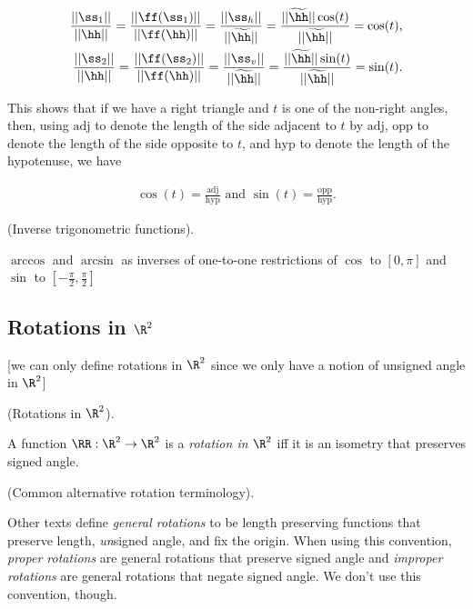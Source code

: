 \begin{deriv}
	\begin{align*}
		\frac{||\ss_1||}{||\hh||} = \frac{||\ff(\ss_1)||}{||\ff(\hh)||} = \frac{||\ss_h||}{||\thh||} = \frac{||\thh||\cos(t)}{||\thh||} = \cos(t), \\
		\frac{||\ss_2||}{||\hh||} = \frac{||\ff(\ss_2)||}{||\ff(\hh)||} = \frac{||\ss_v||}{||\thh||} = \frac{||\thh||\sin(t)}{||\thh||} = \sin(t).
	\end{align*}
	
	This shows that if we have a right triangle and $t$ is one of the non-right angles, then, using $\text{adj}$ to denote the length of the side adjacent to $t$ by $\text{adj}$, $\text{opp}$ to denote the length of the side opposite to $t$, and $\text{hyp}$ to denote the length of the hypotenuse, we have
	
	\begin{align*}
		\cos(t) = \frac{\text{adj}}{\text{hyp}} \text{ and } \sin(t) = \frac{\text{opp}}{\text{hyp}}.
	\end{align*}
\end{deriv}

\begin{defn}
	(Inverse trigonometric functions).
	
	$\arccos$ and $\arcsin$ as inverses of one-to-one restrictions of $\cos$ to $[0, \pi]$ and $\sin$ to $[-\frac{\pi}{2}, \frac{\pi}{2}]$
\end{defn}

\subsection*{Rotations in $\R^2$}

[we can only define rotations in $\R^2$ since we only have a notion of unsigned angle in $\R^2$]

\begin{defn}
	\label{ch::lin_alg::defn::rotation_in_R2}
	(Rotations in $\R^2$).
	
	A function $\RR:\R^2 \rightarrow \R^2$ is a \textit{rotation in $\R^2$} iff it is an isometry that preserves signed angle.
\end{defn}

\begin{remark}
	(Common alternative rotation terminology).
	
	Other texts define \textit{general rotations} to be length preserving functions that preserve length, \textit{un}signed angle, and fix the origin. When using this convention, \textit{proper rotations} are general rotations that preserve signed angle and \textit{improper rotations} are general rotations that negate signed angle. We don't use this convention, though.
\end{remark}

